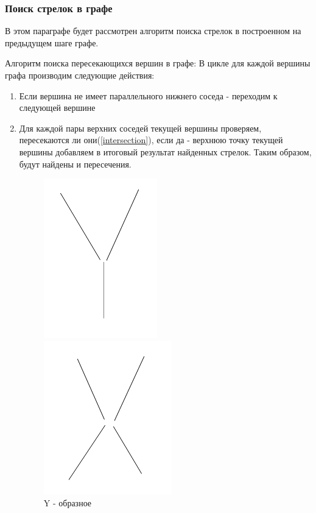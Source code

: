 \subsubsection{Поиск стрелок в графе}

В этом параграфе будет рассмотрен алгоритм поиска стрелок в построенном на предыдущем шаге графе. 

Алгоритм поиска пересекающихся вершин в графе: \newline
В цикле для каждой вершины графа производим следующие действия:
\begin{enumerate}
	\item Если вершина не имеет параллельного нижнего соседа - переходим к следующей вершине
	\item Для каждой пары верхних соседей текущей вершины проверяем, пересекаются ли они(\ref{intersection}), если да - верхнюю точку текущей вершины добавляем в итоговый результат найденных стрелок. Таким образом, будут найдены  и  пересечения.
	\begin{figure}[!h]
		\centering
		\begin{minipage}{0.45\textwidth}
			\centering
			\includegraphics[width=0.7\linewidth,height=0.7\linewidth]{pictures/Y_cross}
			\caption[Y]{Y - образное}
			\label{fig:ycross}
		\end{minipage}
		\begin{minipage}{0.45\textwidth}
			\centering
			\includegraphics[width=0.7\linewidth,height=0.7\linewidth]{pictures/X_cross}

\end{minipage}
\end{figure}
\end{enumerate}
